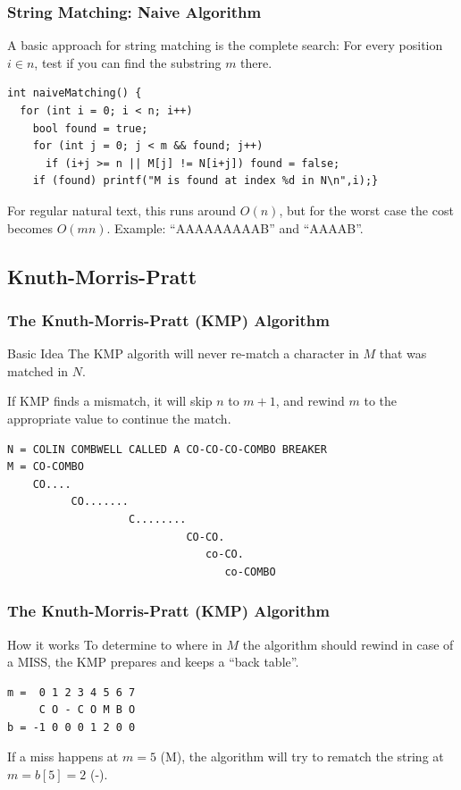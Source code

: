 \documentclass{beamer}
\begin{document}
\begin{frame}
  \frametitle{String Matching: Naive Algorithm}

  {\smaller 
    A basic approach for string matching is the complete
    search: For every position $i \in n$, test if you can find the substring
    $m$ there.  

    \bigskip
    
    \begin{exampleblock}{}
\begin{verbatim}
int naiveMatching() {
  for (int i = 0; i < n; i++)
    bool found = true;
    for (int j = 0; j < m && found; j++)
      if (i+j >= n || M[j] != N[i+j]) found = false;
    if (found) printf("M is found at index %d in N\n",i);}
\end{verbatim}
    \end{exampleblock}
    
    \bigskip

    For regular natural text, this runs around $O(n)$, but for the worst case
    the cost becomes $O(mn)$. Example: ``AAAAAAAAAB'' and ``AAAAB''.
  }
\end{frame}

\subsection{Knuth-Morris-Pratt}
\begin{frame}
  \frametitle{The Knuth-Morris-Pratt (KMP) Algorithm}
  
  \begin{block}{Basic Idea}
    The KMP algorith will never re-match a character in $M$ that was
    matched in $N$. 

    \bigskip

    If KMP finds a mismatch, it will skip $n$ to $m+1$, and rewind $m$ to the 
    appropriate value to continue the match.
  \end{block}

\begin{verbatim}
N = COLIN COMBWELL CALLED A CO-CO-CO-COMBO BREAKER
M = CO-COMBO
    CO....
          CO.......
                   C........
                            CO-CO.
                               co-CO.
                                  co-COMBO 
\end{verbatim}
\end{frame}


\begin{frame}
  \frametitle{The Knuth-Morris-Pratt (KMP) Algorithm}
  {\smaller
    \begin{block}{How it works}
      To determine to where in $M$ the algorithm should rewind in case
      of a MISS, the KMP prepares and keeps a ``back table''.
      
\begin{verbatim}
m =  0 1 2 3 4 5 6 7
     C O - C O M B O
b = -1 0 0 0 1 2 0 0
\end{verbatim}

If a miss happens at $m=5$ (M), the algorithm will try to rematch the
string at $m=b[5]=2$ (-).
    \end{block}
  }
\end{frame}
\end{document}
